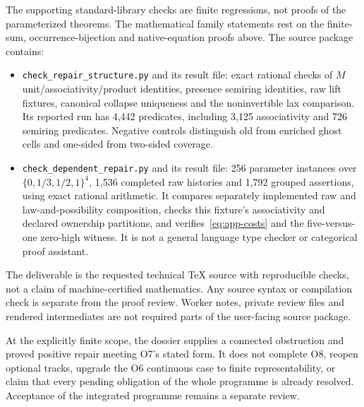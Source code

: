 \documentclass[11pt,a4paper]{article}
\theoremstyle{definition}
\begin{document}
The supporting standard-library checks are finite regressions, not
proofs of the parameterized theorems. The mathematical family statements
rest on the finite-sum, occurrence-bijection and native-equation proofs
above. The source package contains:
\begin{itemize}
\item \texttt{check\_repair\_structure.py} and its result file: exact rational
checks of $M$ unit/associativity/product identities, presence semiring
identities, raw lift fixtures, canonical collapse uniqueness and the
noninvertible lax comparison. Its reported run has 4,442 predicates,
including 3,125 associativity and 726 semiring predicates. Negative
controls distinguish old from enriched ghost cells and one-sided from
two-sided coverage.
\item \texttt{check\_dependent\_repair.py} and its result file: 256 parameter
instances over $\{0,1/3,1/2,1\}^4$, 1,536 completed raw histories and
1,792 grouped assertions, using exact rational arithmetic. It compares
separately implemented raw and law-and-possibility composition, checks
this fixture's associativity and declared ownership partitions, and
verifies~\eqref{eq:app-costs} and the five-versus-one zero-high witness.
It is not a general language type checker or categorical proof assistant.
\end{itemize}

The deliverable is the requested technical TeX source with reproducible
checks, not a claim of machine-certified mathematics. Any source syntax
or compilation check is separate from the proof review. Worker notes,
private review files and rendered intermediates are not required parts
of the user-facing source package.

At the explicitly finite scope, the dossier supplies a connected
obstruction and proved positive repair meeting O7's stated form. It does
not complete O8, reopen optional tracks, upgrade the O6 continuous case
to finite representability, or claim that every pending obligation of
the whole programme is already resolved. Acceptance of the integrated
programme remains a separate review.
\end{document}
